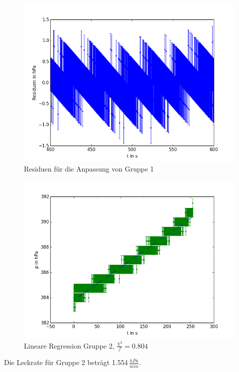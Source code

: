\documentclass[11pt]{beamer}
\begin{document}
\begin{frame}
\begin{figure}[H]
\centering
\includegraphics[scale=0.5]{Bilder/residuen_dichtigkeit_JM.png}
\caption{Residuen für die Anpassung von Gruppe 1}
\end{figure}
\end{frame}

\begin{frame}
\begin{figure}[H]
\centering
\includegraphics[scale=0.5]{Bilder/dichtigkeit__EL.png}
\caption{Lineare Regression Gruppe 2, $\frac{\chi^2}{f}=0.804$}
\end{figure}
Die Leckrate für Gruppe 2 beträgt 1.554$\,\frac{hPa}{min}$.
\end{frame}
\end{document}
